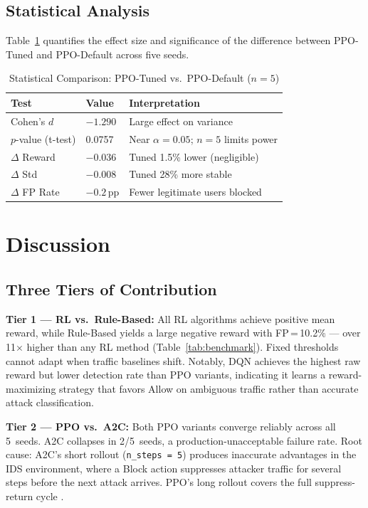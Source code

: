 \documentclass[conference]{IEEEtran}
\begin{document}
\subsection{Statistical Analysis}

Table~\ref{tab:stats} quantifies the effect size and significance of the
difference between PPO-Tuned and PPO-Default across five seeds.

\begin{table}[htbp]
\caption{Statistical Comparison: PPO-Tuned vs.\ PPO-Default ($n{=}5$)}
\label{tab:stats}
\centering
\small
\begin{tabular}{lll}
\toprule
\textbf{Test} & \textbf{Value} & \textbf{Interpretation} \\
\midrule
Cohen's $d$       & $-1.290$ & Large effect on variance \\
$p$-value (t-test) & 0.0757  & Near $\alpha{=}0.05$; $n{=}5$ limits power \\
$\Delta$ Reward    & $-0.036$ & Tuned 1.5\% lower (negligible) \\
$\Delta$ Std       & $-0.008$ & Tuned 28\% more stable \\
$\Delta$ FP Rate   & $-0.2$\,pp & Fewer legitimate users blocked \\
\bottomrule
\end{tabular}
\end{table}


\section{Discussion}

\subsection{Three Tiers of Contribution}

\textbf{Tier 1 --- RL vs.\ Rule-Based:} All RL algorithms achieve positive
mean reward, while Rule-Based yields a large negative reward with
FP\,=\,10.2\% --- over 11$\times$ higher than any RL method (Table~\ref{tab:benchmark}).
Fixed thresholds cannot adapt when traffic baselines shift.
Notably, DQN achieves the highest raw reward but lower detection rate than
PPO variants, indicating it learns a reward-maximizing strategy that favors
Allow on ambiguous traffic rather than accurate attack classification.

\textbf{Tier 2 --- PPO vs.\ A2C:} Both PPO variants converge reliably across
all 5~seeds. A2C collapses in 2/5~seeds, a production-unacceptable failure
rate. Root cause: A2C's short rollout (\texttt{n\_steps\,=\,5}) produces
inaccurate advantages in the IDS environment, where a Block action suppresses
attacker traffic for several steps before the next attack arrives. PPO's long
rollout covers the full suppress-return cycle \cite{colas2019seeds}.
\end{document}
